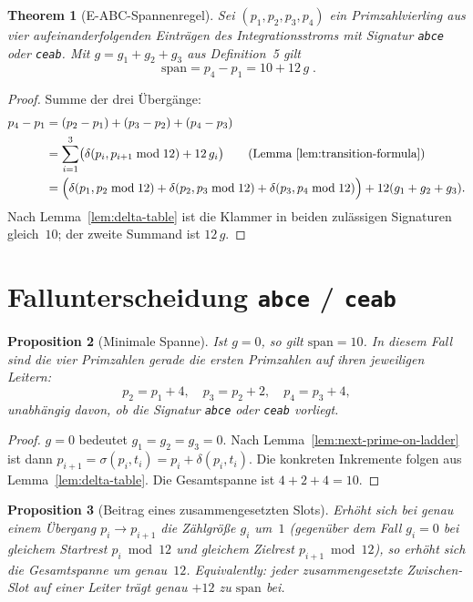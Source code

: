 \documentclass[11pt,a4paper]{article}
\newtheorem{theorem}{Theorem}
\newtheorem{proposition}[theorem]{Proposition}
\begin{document}
\begin{theorem}[E-ABC-Spannenregel]
\label{thm:span-formula}
Sei $(p_1,p_2,p_3,p_4)$ ein Primzahlvierling aus vier aufeinanderfolgenden
Einträgen des Integrationsstroms mit Signatur \texttt{abce} oder \texttt{ceab}.
Mit $g = g_1 + g_2 + g_3$ aus Definition~5 gilt
\[
  \boxed{\;
  \mathrm{span}
  = p_4 - p_1
  = 10 + 12\,g\; }.
\]
\end{theorem}

\begin{proof}
Summe der drei Übergänge:
\begin{align*}
  p_4 - p_1
  &= (p_2 - p_1) + (p_3 - p_2) + (p_4 - p_3)\\
  &= \sum_{i=1}^{3}\bigl(\delta(p_i, p_{i+1}\bmod 12) + 12\,g_i\bigr)
     \qquad\text{(Lemma~\ref{lem:transition-formula})}\\
  &= \Bigl(\delta(p_1,p_2\bmod 12) + \delta(p_2,p_3\bmod 12)
          + \delta(p_3,p_4\bmod 12)\Bigr) + 12(g_1+g_2+g_3).
\end{align*}
Nach Lemma~\ref{lem:delta-table} ist die Klammer in beiden zulässigen Signaturen
gleich~$10$; der zweite Summand ist $12\,g$.
\end{proof}

\section{Fallunterscheidung \texttt{abce} / \texttt{ceab}}

\begin{proposition}[Minimale Spanne]
\label{prop:minimal-span}
Ist $g = 0$, so gilt $\mathrm{span} = 10$.
In diesem Fall sind die vier Primzahlen gerade die ersten Primzahlen auf ihren
jeweiligen Leitern:
\[
  p_2 = p_1 + 4,\quad
  p_3 = p_2 + 2,\quad
  p_4 = p_3 + 4,
\]
unabhängig davon, ob die Signatur \texttt{abce} oder \texttt{ceab} vorliegt.
\end{proposition}

\begin{proof}
$g=0$ bedeutet $g_1=g_2=g_3=0$.
Nach Lemma~\ref{lem:next-prime-on-ladder} ist dann $p_{i+1} = \sigma(p_i,t_i)
= p_i + \delta(p_i,t_i)$.
Die konkreten Inkremente folgen aus Lemma~\ref{lem:delta-table}.
Die Gesamtspanne ist $4+2+4=10$.
\end{proof}

\begin{proposition}[Beitrag eines zusammengesetzten Slots]
\label{prop:plus-twelve}
Erhöht sich bei genau einem Übergang $p_i \to p_{i+1}$ die Zählgröße $g_i$ um~$1$
(gegenüber dem Fall $g_i=0$ bei gleichem Startrest $p_i \bmod 12$ und gleichem
Zielrest $p_{i+1}\bmod 12$), so erhöht sich die Gesamtspanne um genau~$12$.
Equivalently: jeder zusammengesetzte Zwischen-Slot auf einer Leiter trägt
genau $+12$ zu $\mathrm{span}$ bei.
\end{proposition}
\end{document}
